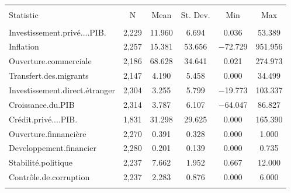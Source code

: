 
\begin{table}[!htbp] \centering 
  \caption{} 
  \label{} 
\begin{tabular}{@{\extracolsep{5pt}}lccccc} 
\\[-1.8ex]\hline 
\hline \\[-1.8ex] 
Statistic & \multicolumn{1}{c}{N} & \multicolumn{1}{c}{Mean} & \multicolumn{1}{c}{St. Dev.} & \multicolumn{1}{c}{Min} & \multicolumn{1}{c}{Max} \\ 
\hline \\[-1.8ex] 
Investissement.privé....PIB. & 2,229 & 11.960 & 6.694 & 0.036 & 53.389 \\ 
Inflation & 2,257 & 15.381 & 53.656 & $-$72.729 & 951.956 \\ 
Ouverture.commerciale & 2,186 & 68.628 & 34.641 & 0.021 & 274.973 \\ 
Transfert.des.migrants & 2,147 & 4.190 & 5.458 & 0.000 & 34.499 \\ 
Investissement.direct.étranger & 2,304 & 3.255 & 5.799 & $-$19.773 & 103.337 \\ 
Croissance.du.PIB & 2,314 & 3.787 & 6.107 & $-$64.047 & 86.827 \\ 
Crédit.privé....PIB. & 1,831 & 31.298 & 29.625 & 0.000 & 165.390 \\ 
Ouverture.finnancière & 2,270 & 0.391 & 0.328 & 0.000 & 1.000 \\ 
Developpement.financier & 2,280 & 0.201 & 0.139 & 0.000 & 0.735 \\ 
Stabilité.politique & 2,237 & 7.662 & 1.952 & 0.667 & 12.000 \\ 
Contrôle.de.corruption & 2,237 & 2.283 & 0.876 & 0.000 & 6.000 \\ 
\hline \\[-1.8ex] 
\end{tabular} 
\end{table} 
